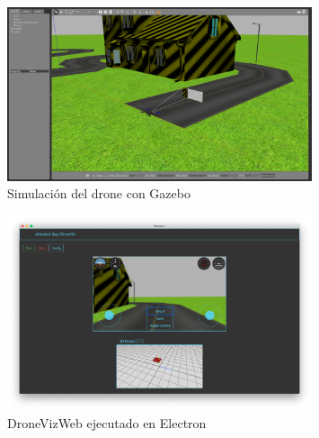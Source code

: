 \begin{figure}[H]
  \begin{center}
    \includegraphics[width=0.8\textwidth]{figures/gazebodrone.png}
    		\caption{Simulación del drone con Gazebo}
		\label{fig.testcamserver1}
		\end{center}
\end{figure}

\begin{figure}[H]
  \begin{center}
    \includegraphics[width=0.8\textwidth]{figures/dronevizelectron.png}
    		\caption{DroneVizWeb ejecutado en Electron}
		\label{fig.dronevizelectron}
		\end{center}
\end{figure}










